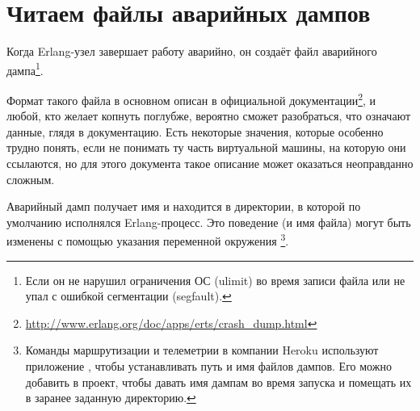 \chapter{Читаем файлы аварийных дампов}
\label{chap:crash-dumps}

Когда Erlang-узел завершает работу аварийно, он создаёт файл аварийного дампа\footnote{Если он не нарушил ограничения ОС (ulimit) во время записи файла или не упал с ошибкой сегментации (segfault).}.

Формат такого файла в основном описан в официальной документации\footnote{\href{http://www.erlang.org/doc/apps/erts/crash\_dump.html}{http://www.erlang.org/doc/apps/erts/crash\_dump.html}}, и любой, кто желает копнуть поглубже, вероятно сможет разобраться, что означают данные, глядя в документацию. Есть некоторые значения, которые особенно трудно понять, если не понимать ту часть виртуальной машины, на которую они ссылаются, но для этого документа такое описание может оказаться неоправданно сложным. 

Аварийный дамп получает имя  и находится в директории, в которой по умолчанию исполнялся Erlang-процесс. Это поведение (и имя файла) могут быть изменены с помощью указания переменной окружения \footnote{Команды маршрутизации и телеметрии в компании Heroku используют приложение , чтобы устанавливать путь и имя файлов дампов. Его можно добавить в проект, чтобы давать имя дампам во время запуска и помещать их в заранее заданную директорию.}.


